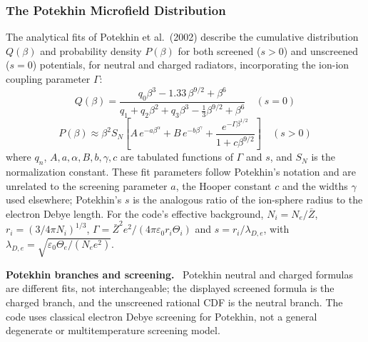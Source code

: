 \documentclass[11pt,a4paper]{article}
\newenvironment{implnote}[1][Implementation]{%
  \par\smallskip\noindent\begin{lrbox}{\notebox}\setlength{\fboxsep}{6pt}\begin{minipage}{\dimexpr\linewidth-2\fboxsep-2\fboxrule\relax}\small\textbf{#1.}\ }{%
  \end{minipage}\end{lrbox}\setlength{\fboxsep}{6pt}\fcolorbox{noteframe}{notebg}{\usebox{\notebox}}\par\smallskip}
\numberwithin{equation}{section}
\begin{document}
\subsubsection{The Potekhin Microfield Distribution}
The analytical fits of Potekhin et al.\ (2002) \cite{potekhin} describe the cumulative distribution $Q(\beta)$ and probability density $P(\beta)$ for both screened ($s > 0$) and unscreened ($s = 0$) potentials, for neutral and charged radiators, incorporating the ion-ion coupling parameter $\Gamma$:
\begin{equation}
Q(\beta) = \frac{q_0 \beta^3 - 1.33\,\beta^{9/2} + \beta^6}{q_1 + q_2 \beta^2 + q_3 \beta^3 - \tfrac{1}{3}\beta^{9/2} + \beta^6}
\quad (s=0)
\end{equation}
\begin{equation}
P(\beta) \approx \beta^2 S_N \!\left[ A\,e^{-a\beta^\alpha} + B\,e^{-b\beta^\gamma} + \frac{e^{-\Gamma\beta^{1/2}}}{1 + c\beta^{9/2}} \right]
\quad (s>0)
\end{equation}
where $q_n$, $A, a, \alpha, B, b, \gamma, c$ are tabulated functions of $\Gamma$ and $s$, and $S_N$ is the normalization constant. These fit parameters follow Potekhin's notation and are unrelated to the screening parameter $a$, the Hooper constant $c$ and the widths $\gamma$ used elsewhere; Potekhin's $s$ is the analogous ratio of the ion-sphere radius to the electron Debye length.
For the code's effective background,
$N_i=N_e/\bar Z$, $r_i=(3/4\pi N_i)^{1/3}$,
$\Gamma=\bar Z^2e^2/(4\pi\varepsilon_0r_i\Theta_i)$ and
$s=r_i/\lambda_{D,e}$, with
$\lambda_{D,e}=\sqrt{\varepsilon_0\Theta_e/(N_e e^2)}$.

\begin{implnote}[Potekhin branches and screening]
Potekhin neutral and charged formulas are different fits, not interchangeable;
the displayed screened formula is the charged branch, and the unscreened
rational CDF is the neutral branch. The code uses classical electron Debye
screening for Potekhin, not a general degenerate or multitemperature screening model.
\end{implnote}
\end{document}
